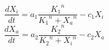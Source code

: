 \documentclass[preview]{standalone}
\begin{document}
$$\frac{dX_i}{dt} = a_1 \frac{{K_1}^n}{{K_1}^n+{X_a}^n} - c_1 X_i $$
$$\frac{dX_a}{dt} = a_2 \frac{{K_2}^n}{{K_2}^n+{X_i}^n} - c_2 X_a $$
\end{document}
